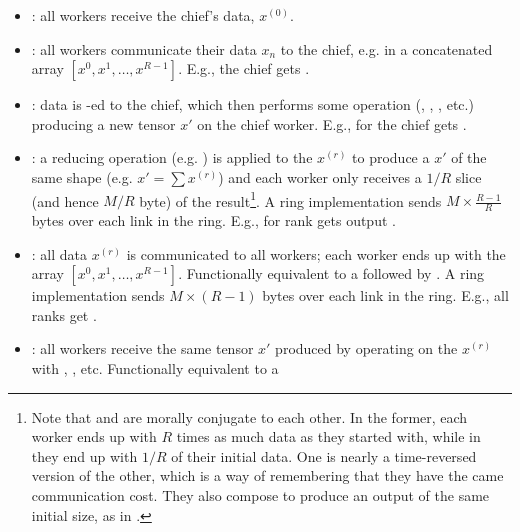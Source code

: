 \begin{itemize}
	\item {}: all workers receive  the chief's data, $ x ^{ (0) }  $.
	\item {}: all workers communicate their data $ x _{ n } $ to the chief, e.g. in a
	      concatenated array $ [x ^{ 0 }, x ^{ 1 }, \ldots , x ^{ R-1 }] $. E.g., the chief gets
          .
	\item {}: data is -ed to the chief, which then performs some
	      operation (, , , etc.) producing a new tensor $
		      x' $ on the chief worker. E.g., for  the chief gets
              .
    \item {}: a reducing operation (e.g. ) is applied to the $ x
        ^{ (r) } $ to produce a $ x' $ of the same shape (e.g. $ x'= \sum x ^{ (r) } $) and each
        worker only receives a $ 1/R $ slice (and hence $ M/R $ byte) of the result\footnote{Note that 
            and  are morally conjugate to each other. In the former, each
            worker ends up with $ R $ times as much data as they started with, while in
         they end up with $ 1/R $ of their initial data. One is nearly a
        time-reversed version of the other, which is a way of remembering that they have the came
        communication cost. They also compose to produce an output of the same initial size, as in
        .}. A ring implementation sends $ M \times \frac{ R-1 }{ R } $ bytes
        over each link in the ring. E.g., for  rank  gets output
        .
    \item {}: all data $ x ^{ (r) } $ is communicated to all workers; each worker
        ends up with the array $ [x ^{ 0 }, x ^{ 1 }, \ldots , x ^{ R-1 }] $. Functionally
        equivalent to a  followed by . A ring implementation
        sends $ M \times \left ( R-1 \right ) $ bytes over each link in the ring. E.g., all ranks
        get .
	\item {}: all workers receive the same tensor $ x' $ produced by operating on
	      the $ x ^{ (r) } $ with , , etc. Functionally equivalent to a

\end{itemize}
